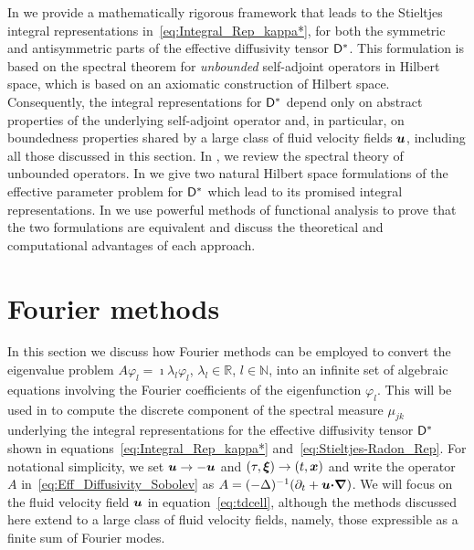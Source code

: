 \documentclass[amsa]{ipart}
\begin{document}
In  we provide a mathematically rigorous
framework that leads to the Stieltjes integral representations
in~\eqref{eq:Integral_Rep_kappa*}, for both the symmetric and
antisymmetric parts of the effective diffusivity tensor $\mathsf{D}^*$. This
formulation is based on the spectral theorem for 
\emph{unbounded} self-adjoint operators in  Hilbert space, which is
based on an axiomatic construction of Hilbert 
space. Consequently, the integral representations for $\mathsf{D}^*$ depend
only on abstract properties of the underlying self-adjoint operator
and, in particular, on boundedness properties shared by a large
class of fluid velocity fields $\boldsymbol{u}$, including all those
discussed in this section. In , we
review the spectral theory of unbounded operators. In 
 we give two natural
Hilbert space formulations of the effective parameter problem for
$\mathsf{D}^*$ which lead to its promised integral representations. In
 we use powerful methods of
functional analysis to prove that the two formulations are equivalent
and discuss the theoretical and computational advantages of each
approach.  



  
\section{Fourier methods}
\label{sec:Fourier_Methods} 
%
In this section we discuss how Fourier methods can be employed to
convert the eigenvalue problem $A\varphi_l=\imath\lambda_l\varphi_l$, $\lambda_l\in\mathbb{R}$,
$l\in\mathbb{N}$, into an infinite set of algebraic equations involving
the Fourier coefficients of the eigenfunction $\varphi_l$. This will be used
in  to compute the discrete component of the
spectral measure $\mu_{jk}$ underlying the integral representations for
the effective diffusivity tensor $\mathsf{D}^*$ shown in
equations~\eqref{eq:Integral_Rep_kappa*}
and~\eqref{eq:Stieltjes-Radon_Rep}.  For notational simplicity, we set
$\boldsymbol{u}\to-\boldsymbol{u}$ and $(\tau,\boldsymbol{\xi})\to(t,\boldsymbol{x})$ and write the operator $A$
in~\eqref{eq:Eff_Diffusivity_Sobolev} as
$A=(-\Delta)^{-1}(\partial_t+\boldsymbol{u}\mbox{\boldmath${\cdot}$}\mbox{\boldmath${\nabla}$})$. We will focus on the fluid
velocity field $\boldsymbol{u}$ in equation~\eqref{eq:tdcell}, although the methods
discussed here extend to a large class of fluid velocity fields,
namely, those expressible as a finite sum of Fourier modes.
\end{document}
